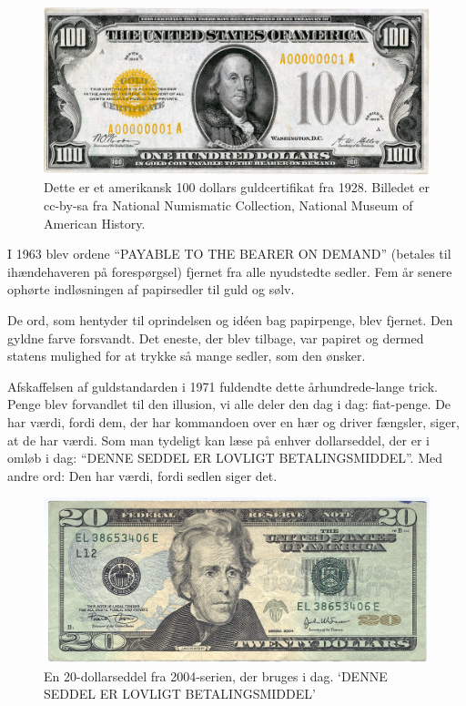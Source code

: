 \documentclass[paper=6in:9in,pagesize=pdftex,
               headinclude=on,footinclude=on,12pt]{scrbook}
\begin{document}
\begin{figure}
  \centering
  \includegraphics{assets/images/us-gold-cert-100-smaller.png}
  \caption{Dette er et amerikansk 100 dollars guldcertifikat fra 1928. Billedet er cc-by-sa fra National Numismatic Collection, National Museum of American History.}
  \label{fig:us-gold-cert-100-smaller}
\end{figure}

I 1963 blev ordene \enquote{PAYABLE TO THE BEARER ON DEMAND} (betales til ihændehaveren på forespørgsel) fjernet fra alle nyudstedte sedler. Fem år senere ophørte indløsningen af papirsedler til guld og sølv.

De ord, som hentyder til oprindelsen og id\'een bag papirpenge, blev fjernet. Den gyldne farve forsvandt. Det eneste, der blev tilbage, var papiret og dermed statens mulighed for at trykke så mange sedler, som den ønsker.

Afskaffelsen af guldstandarden i 1971 fuldendte dette århundrede-lange trick. Penge blev forvandlet til den illusion, vi alle deler den dag i dag: fiat-penge. De har værdi, fordi dem, der har kommandoen over en hær og driver fængsler, siger, at de har værdi. Som man tydeligt kan læse på enhver dollarseddel, der er i omløb i dag: \enquote{DENNE SEDDEL ER LOVLIGT BETALINGSMIDDEL}. Med andre ord: Den har værdi, fordi sedlen siger det.\begin{figure}
  \centering
  \includegraphics{assets/images/us-dollar-2004.jpg}
  \caption{En 20-dollarseddel fra 2004-serien, der bruges i dag. `DENNE SEDDEL ER LOVLIGT BETALINGSMIDDEL'}
  \label{fig:us-dollar-2004}
\end{figure}
\end{document}
